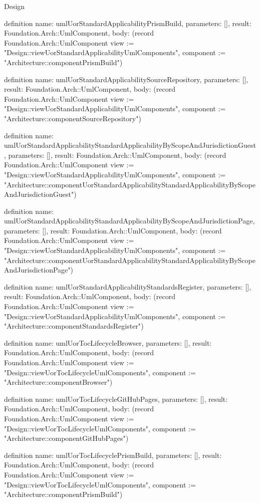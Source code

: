 \begin{lexlean}{Design}
\begin{semanticmodule}
definition{
  name: umlUorStandardApplicabilityPrismBuild,
  parameters: [],
  result: Foundation.Arch::UmlComponent,
  body: (record Foundation.Arch::UmlComponent {view := "Design::viewUorStandardApplicabilityUmlComponents", component := "Architecture::componentPrismBuild"})
}

definition{
  name: umlUorStandardApplicabilitySourceRepository,
  parameters: [],
  result: Foundation.Arch::UmlComponent,
  body: (record Foundation.Arch::UmlComponent {view := "Design::viewUorStandardApplicabilityUmlComponents", component := "Architecture::componentSourceRepository"})
}

definition{
  name: umlUorStandardApplicabilityStandardApplicabilityByScopeAndJurisdictionGuest,
  parameters: [],
  result: Foundation.Arch::UmlComponent,
  body: (record Foundation.Arch::UmlComponent {view := "Design::viewUorStandardApplicabilityUmlComponents", component := "Architecture::componentUorStandardApplicabilityStandardApplicabilityByScopeAndJurisdictionGuest"})
}

definition{
  name: umlUorStandardApplicabilityStandardApplicabilityByScopeAndJurisdictionPage,
  parameters: [],
  result: Foundation.Arch::UmlComponent,
  body: (record Foundation.Arch::UmlComponent {view := "Design::viewUorStandardApplicabilityUmlComponents", component := "Architecture::componentUorStandardApplicabilityStandardApplicabilityByScopeAndJurisdictionPage"})
}

definition{
  name: umlUorStandardApplicabilityStandardsRegister,
  parameters: [],
  result: Foundation.Arch::UmlComponent,
  body: (record Foundation.Arch::UmlComponent {view := "Design::viewUorStandardApplicabilityUmlComponents", component := "Architecture::componentStandardsRegister"})
}

definition{
  name: umlUorTocLifecycleBrowser,
  parameters: [],
  result: Foundation.Arch::UmlComponent,
  body: (record Foundation.Arch::UmlComponent {view := "Design::viewUorTocLifecycleUmlComponents", component := "Architecture::componentBrowser"})
}

definition{
  name: umlUorTocLifecycleGitHubPages,
  parameters: [],
  result: Foundation.Arch::UmlComponent,
  body: (record Foundation.Arch::UmlComponent {view := "Design::viewUorTocLifecycleUmlComponents", component := "Architecture::componentGitHubPages"})
}

definition{
  name: umlUorTocLifecyclePrismBuild,
  parameters: [],
  result: Foundation.Arch::UmlComponent,
  body: (record Foundation.Arch::UmlComponent {view := "Design::viewUorTocLifecycleUmlComponents", component := "Architecture::componentPrismBuild"})
}


\end{semanticmodule}
\end{lexlean}
